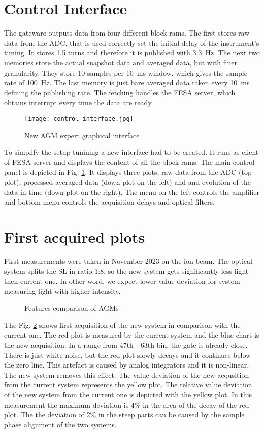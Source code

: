 \section{Control Interface}
The gateware outputs data from four different block rams. The first stores raw
data from the ADC, that is used correctly set the initial delay of the
instrument's timing. It stores 1.5 turns and therefore it is published with
\SI{3.3}{Hz}. The next two memories store the actual snapshot data and averaged
data, but with finer granularity. They store 10 samples per \SI{10}{ms} window,
which gives the sample rate of \SI{100}{Hz}. The last memory is just bare
averaged data taken every \SI{10}{ms} defining the publishing rate. The
fetching handles the FESA server, which obtains interrupt every time the data
are ready. 
\begin{figure}[!tbh]
    \centering
    \texttt{[image: control\_interface.jpg]}
    \caption{New AGM expert graphical interface}
    \label{fig:control_interface}
\end{figure}
To simplify the setup tunining a new interface had to be created. It runs as
client of FESA server and displays the content of all the block rams. The main
control panel is depicted in Fig. \ref{fig:control_interface}. It displays
three plots, raw data from the ADC (top plot), processed averaged data (down
plot on the left) and and evolution of the data in time (down plot on the
right). The menu on the left controls the amplifier and bottom menu controls
the acquisition delays and optical filters.

\section{First acquired plots}
First measurements were taken in November 2023 on the ion beam. The
optical system splits the SL in ratio 1:8, so the new system gets
significantly less light then current one. In other word, we expect
lower value deviation for system measuring light with higher intensity.  
\begin{figure}[!htb]
    \begin{center}
        \scalebox{0.54}{}
        \caption{Features comparison of AGMs}
        \label{fig:comparison_chart}
    \end{center}
\end{figure}
The Fig. \ref{fig:comparison_chart} shows first acquisition of the new system
in comparison with the current one. The red plot is measured by the current
system and the blue chart is the new acquisition. In a range from 47th - 63th
bin, the gate is already close. There is just white noise, but the red plot
slowly decays and it continues below the zero line. This artefact is caused by
analog integrators and it is non-linear. The new system removes this effect.
The value deviation of the new acqusition from the current system represents
the yellow plot.   The relative value deviation of the new system from the
current one is depicted with the yellow plot. In this measurement the maximum
deviation is 4\% in the area of the decay of the red plot. The the deviation of
2\% in the steep parts can be caused by the sample phase alignment of the two
systems.   

